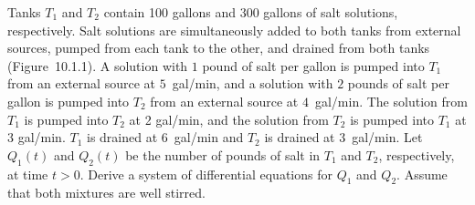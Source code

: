 \setcounter{example}{0}
\begin{example}
  \label{example:10.1.1} \rm Tanks $T_{1}$ and $T_{2}$ contain 100 gallons and 300 gallons of salt
  solutions, respectively. Salt solutions are simultaneously added to both tanks from external
  sources, pumped from each tank to the other, and drained from both tanks
  (Figure~10.1.1). A solution with $1$ pound of salt per gallon is pumped into $T_{1}$
  from an external source at $5$~gal/min, and a solution with $2$ pounds of salt per gallon is
  pumped into $T_{2}$ from an external source at $4$~gal/min. The solution from $T_{1}$ is pumped
  into $T_{2}$ at 2 gal/min, and the solution from $T_{2}$ is pumped into $T_{1}$ at $3$ gal/min.
  $T_{1}$ is drained at $6$~gal/min and $T_{2}$ is drained at 3~gal/min. Let $Q_{1}(t)$ and
  $Q_{2}(t)$ be the number of pounds of salt in $T_{1}$ and $T_{2}$, respectively, at time $t>0$.
  Derive a system of differential equations for $Q_{1}$ and $Q_{2}$. Assume that both mixtures are
  well stirred.
\end{example}
\setcounter{equation}{0}
